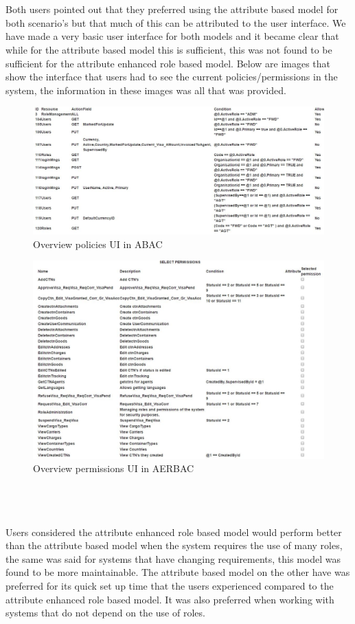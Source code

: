 \textbf{ }
\\
\\
Both users pointed out that they preferred using the attribute based model for both scenario's but that much of this can be attributed to the user interface. 
We have made a very basic user interface for both models and it became clear that while for the attribute based model this is sufficient, this was not found to be sufficient for the attribute enhanced role based model.
Below are images that show the interface that users had to see the current policies/permissions in the system, the information in these images was all that was provided.

\begin{figure}[h]
    \centering
    \includegraphics[width=1\textwidth, height=0.24\textwidth]{Img/Tool/ABACPolicies.JPG}
    \caption{Overview policies UI in ABAC}
\end{figure}
\begin{figure}[h]
    \centering
    \includegraphics[width=1\textwidth, height=0.24\textwidth]{Img/Tool/RBACPermissions.JPG}
    \caption{Overview permissions UI in AERBAC}
\end{figure}
\\

\textbf{ }
\\
\\
Users considered the attribute enhanced role based model would perform better than the attribute based model when the system requires the use of many roles, the same was said for systems that have changing requirements, this model was found to be more maintainable.
The attribute based model on the other have was preferred for its quick set up time that the users experienced compared to the attribute enhanced role based model.
It was also preferred when working with systems that do not depend on the use of roles.
\\

